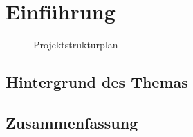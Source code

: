 \chapter{Einführung}

\blindtext

\begin{figure}
	\centering
	\caption{Projektstrukturplan}
	\label{fig:PSP}
\end{figure}

\section{Hintergrund des Themas}

\section{Zusammenfassung} %



